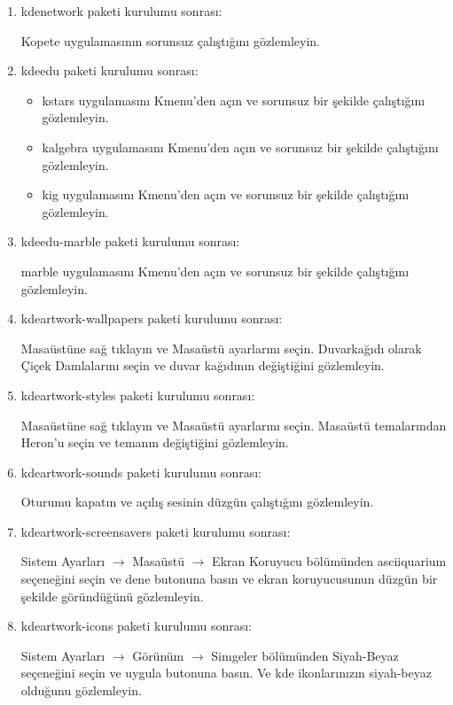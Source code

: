 \documentclass[a4paper,10pt]{article}
\begin{document}
\begin{enumerate}
\item kdenetwork paketi kurulumu sonrası: 

Kopete uygulamasının sorunsuz çalıştığını gözlemleyin.

\item kdeedu paketi kurulumu sonrası: 
\begin{itemize}
 \item kstars uygulamasını Kmenu'den açın ve sorunsuz bir şekilde çalıştığını gözlemleyin. 
 \item kalgebra uygulamasını Kmenu'den açın ve sorunsuz bir şekilde çalıştığını gözlemleyin. 
 \item kig uygulamasını Kmenu'den açın ve sorunsuz bir şekilde çalıştığını gözlemleyin. 
\end{itemize}

\item kdeedu-marble paketi kurulumu sonrası: 

marble uygulamasını Kmenu'den açın ve sorunsuz bir şekilde çalıştığını gözlemleyin. 
\item kdeartwork-wallpapers paketi kurulumu sonrası: 

Masaüstüne sağ tıklayın ve Masaüstü ayarlarını seçin. Duvarkağıdı olarak Çiçek Damlalarını seçin ve duvar kağıdının değiştiğini gözlemleyin.

\item kdeartwork-styles paketi kurulumu sonrası: 

Masaüstüne sağ tıklayın ve Masaüstü ayarlarını seçin. Masaüstü temalarından Heron'u seçin ve temanın değiştiğini gözlemleyin.

\item kdeartwork-sounds paketi kurulumu sonrası:

Oturumu kapatın ve açılış sesinin düzgün çalıştığını gözlemleyin.

\item kdeartwork-screensavers paketi kurulumu sonrası:

Sistem Ayarları $\rightarrow$ Masaüstü $\rightarrow$ Ekran Koruyucu bölümünden asciiquarium seçeneğini seçin ve dene butonuna basın ve ekran koruyucusunun düzgün bir şekilde göründüğünü gözlemleyin.

\item kdeartwork-icons paketi kurulumu sonrası:

Sistem Ayarları $\rightarrow$ Görünüm $\rightarrow$ Simgeler bölümünden Siyah-Beyaz seçeneğini seçin ve uygula butonuna basın. Ve kde ikonlarınızın siyah-beyaz olduğunu gözlemleyin.


\end{enumerate}
\end{document}

